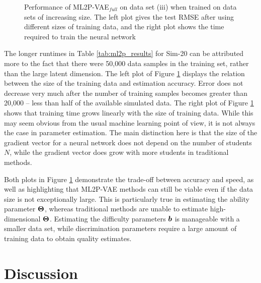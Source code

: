 \begin{figure}[h]
\begin{subfigure}{.47\textwidth}
    \end{subfigure}
    \caption{Performance of ML2P-VAE$_{full}$ on data set (iii) when trained on data sets of increasing size. The left plot gives the test RMSE after using different sizes of training data, and the right plot shows the time required to train the neural network}
    \label{fig:train_size}
\end{figure}

The longer runtimes in Table \ref{tab:ml2p_results} for Sim-20 can be attributed more to the fact that there were 50,000 data samples in the training set, rather than the large latent dimension. The left plot of Figure \ref{fig:train_size} displays the relation between the size of the training data and estimation accuracy. Error does not decrease very much after the number of training samples becomes greater than 20,000 -- less than half of the available simulated data. The right plot of Figure \ref{fig:train_size} shows that training time grows linearly with the size of training data. While this may seem obvious from the usual machine learning point of view, it is not always the case in parameter estimation. The main distinction here is that the size of the gradient vector for a neural network does not depend on the number of students $N$, while the gradient vector does grow with more students in traditional methods.

Both plots in Figure \ref{fig:train_size} demonstrate the trade-off between accuracy and speed, as well as highlighting that ML2P-VAE methods can still be viable even if the data size is not exceptionally large. This is particularly true in estimating the ability parameter $\boldsymbol{\Theta}$, whereas traditional methods are unable to estimate high-dimensional $\boldsymbol{\Theta}$. Estimating the difficulty parameters $\boldsymbol{b}$ is manageable with a smaller data set, while discrimination parameters require a large amount of training data to obtain quality estimates.


\section{Discussion}
